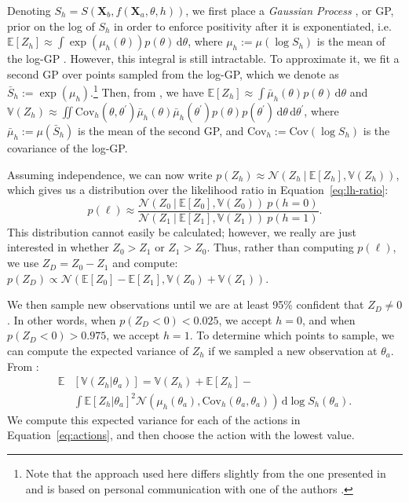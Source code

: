 \documentclass[10pt,letterpaper]{article}
\newcommand{\Xa}[0]{\mathbf{X}_a}
\newcommand{\Xb}[0]{\mathbf{X}_b}
\newcommand{\hi}[0]{h=0}
\newcommand{\hf}[0]{h=1}
\newcommand{\dif}[0]{\,\mathrm{d}}
\begin{document}
Denoting $S_h=S(\Xb, f(\Xa, \theta, h))$, we first place a
\textit{Gaussian Process} \cite{Rasmussen:2006vz}, or GP, prior on the
log of $S_h$ in order to enforce positivity after it is exponentiated,
i.e. $\mathbb{E}[Z_h] \approx \int
\exp(\mu_h(\theta))p(\theta)\dif\theta$, where $\mu_h:=\mu(\log S_h)$
is the mean of the log-GP \cite{Osborne:2012tm}.  However, this
integral is still intractable. To approximate it, we fit a second GP
over points sampled from the log-GP, which we denote as
$\bar{S}_h:=\exp(\mu_h)$.\footnote{Note that the approach used here
  differs slightly from the one presented in 
  and is based on personal communication with one of the authors
  \cite{Duvenaud:2013td}.} Then, from , we have
$\mathbb{E}[Z_h] \approx \int \bar{\mu}_h(\theta)p(\theta)\dif\theta$
and $\mathbb{V}(Z_h) \approx \iint \mathrm{Cov}_h(\theta,
\theta^\prime)\bar{\mu}_h(\theta)\bar{\mu}_h(\theta^\prime)p(\theta)p(\theta^\prime)\dif\theta\dif\theta^\prime$,
where $\bar{\mu}_h:=\mu(\bar{S}_h)$ is the mean of the second GP, and
$\mathrm{Cov}_h:=\mathrm{Cov}(\log S_h)$ is the covariance of the
log-GP.

Assuming independence, we can now write $p(Z_h)\approx\mathcal{N}(Z_h\
\vert\ \mathbb{E}[Z_h], \mathbb{V}(Z_h))$, which gives us a
distribution over the likelihood ratio in Equation~\ref{eq:lh-ratio}:
\begin{equation}
p(\ell)\approx\frac{\mathcal{N}(Z_0\ \vert\ \mathbb{E}[Z_0], \mathbb{V}(Z_0))\ p(\hi)}{\mathcal{N}(Z_1\ \vert\ \mathbb{E}[Z_1], \mathbb{V}(Z_1))\ p(\hf)}.
\end{equation}
This distribution cannot easily be calculated; however, we really are
just interested in whether $Z_0>Z_1$ or $Z_1>Z_0$. Thus, rather than
computing $p(\ell)$, we use $Z_D=Z_0-Z_1$ and compute:
$p(Z_D)\propto\mathcal{N}(\mathbb{E}[Z_0] - \mathbb{E}[Z_1],
\mathbb{V}(Z_0) + \mathbb{V}(Z_1))$.

We then sample new observations until we are at least 95\% confident
that $Z_D\neq 0$. In other words, when $p(Z_D<0)<0.025$, we accept
$\hi$, and when $p(Z_D<0)>0.975$, we accept $\hf$. To determine which
points to sample, we can compute the expected variance of $Z_h$ if we
sampled a new observation at $\theta_a$. From \citeA{Osborne:2012tm}:
\begin{align}
\mathbb{E}&[\mathbb{V}(Z_h|\theta_a)]=\mathbb{V}(Z_h) + \mathbb{E}[Z_h] - \\
&\int \mathbb{E}[Z_h|\theta_{a}]^2 \mathcal{N}(\mu_h(\theta_a), \mathrm{Cov}_h(\theta_a, \theta_a))\dif\log S_h(\theta_a).\nonumber
\label{ref:expected-variance}
\end{align}
We compute this expected variance for each of the actions in
Equation~\ref{eq:actions}, and then choose the action with the lowest
value.
\end{document}
